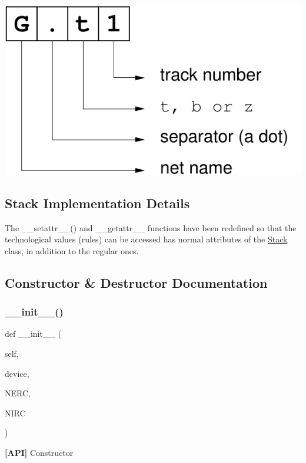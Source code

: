  
\begin{DoxyImage}
\includegraphics[width=.4\linewidth]{wiring-spec-1}
\end{DoxyImage}
\hypertarget{classpython_1_1stack_1_1Stack_secStackImplDetails}{}\subsection{Stack Implementation Details}\label{classpython_1_1stack_1_1Stack_secStackImplDetails}
The {\ttfamily \+\_\+\+\_\+setattr\+\_\+\+\_\+()} and {\ttfamily \+\_\+\+\_\+getattr\+\_\+\+\_\+} functions have been redefined so that the technological values (rules) can be accessed has normal attributes of the \mbox{\hyperlink{classpython_1_1stack_1_1Stack}{Stack}} class, in addition to the regular ones. 

\subsection{Constructor \& Destructor Documentation}
\mbox{\label{classpython_1_1stack_1_1Stack_a818e80b2a75b3e0d06f9826d1c60ecab}} 
\subsubsection{\texorpdfstring{\+\_\+\+\_\+init\+\_\+\+\_\+()}{\_\_init\_\_()}}
{\footnotesize\ttfamily def \+\_\+\+\_\+init\+\_\+\+\_\+ (\begin{DoxyParamCaption}\item[{}]{self,  }\item[{}]{device,  }\item[{}]{N\+E\+RC,  }\item[{}]{N\+I\+RC }\end{DoxyParamCaption})}



{\bfseries \mbox{[}A\+PI\mbox{]}} Constructor 

